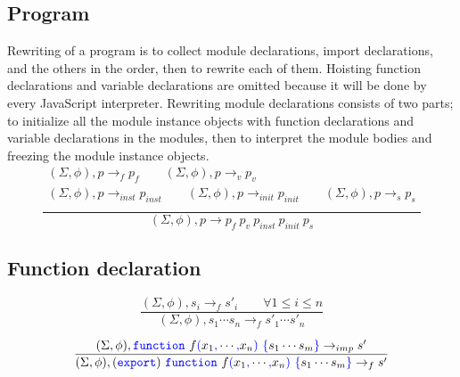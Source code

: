 \documentclass[a4paper]{article}
\newcommand{\code}[1]{\textcolor{blue}{\tt #1}}
\begin{document}
\subsection{Program}
Rewriting of a program is to collect module declarations, import declarations, and the others in the order, then to rewrite each of them. Hoisting function declarations and variable declarations are omitted because it will be done by every JavaScript interpreter. Rewriting module declarations consists of two parts; to initialize all the module instance objects with function declarations and variable declarations in the modules, then to interpret the module bodies and freezing the module instance objects.
\begin{equation*}
\frac{
    \begin{array}{c}
    (\Sigma, \phi), p \rightarrow_f p_f \qquad
    (\Sigma, \phi), p \rightarrow_v p_v \\
    (\Sigma, \phi), p \rightarrow_{inst} p_{inst} \qquad
    (\Sigma, \phi), p \rightarrow_{init} p_{init} \qquad
    (\Sigma, \phi), p \rightarrow_s p_s \\
    \end{array}
}{
    (\Sigma, \phi), p \rightarrow p_f\ p_v\ p_{inst}\ p_{init}\ p_s
}
\end{equation*}

\subsection{Function declaration}
\begin{equation*}
\frac{
    (\Sigma, \phi), s_i \rightarrow_f s'_i \qquad \forall 1 \le i \le n
}{
    (\Sigma, \phi), s_1 \cdots s_n \rightarrow_f s'_1 \cdots s'_n
}
\end{equation*}

\begin{equation*}
\frac{
(\Sigma, \phi), \code{function}\ f \code{(} x_1 \code{,} \cdots \code{,}  x_n \code{)}\ \code{\{} s_1 \cdots s_m \code{\}} \rightarrow_{imp} s'
}{
(\Sigma, \phi), (\code{export})\ \code{function}\ f \code{(} x_1 \code{,} \cdots \code{,}  x_n \code{)}\ \code{\{} s_1 \cdots s_m \code{\}} \rightarrow_f s'
}
\end{equation*}
\end{document}
